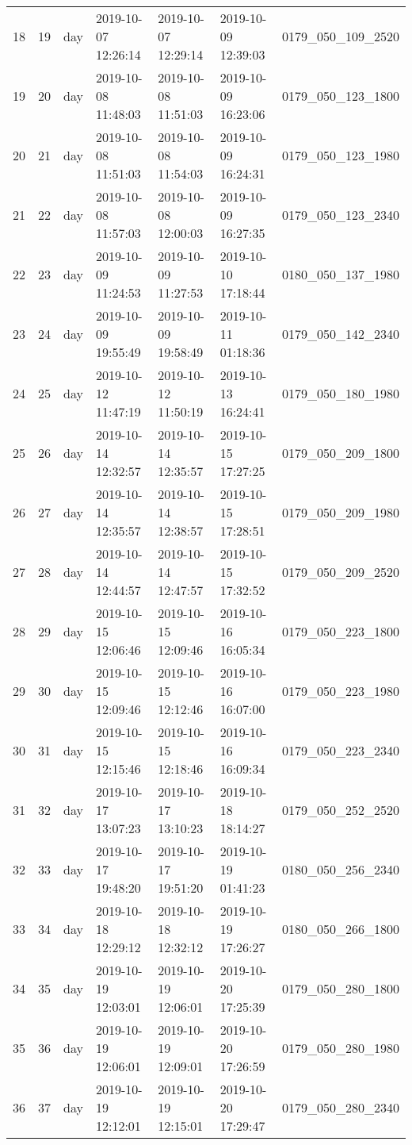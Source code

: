 \begin{longtable}{lrlllll}
18 & 19 & day & 2019-10-07 12:26:14 & 2019-10-07 12:29:14 & 2019-10-09 12:39:03 & 0179_050_109_2520 \\
19 & 20 & day & 2019-10-08 11:48:03 & 2019-10-08 11:51:03 & 2019-10-09 16:23:06 & 0179_050_123_1800 \\
20 & 21 & day & 2019-10-08 11:51:03 & 2019-10-08 11:54:03 & 2019-10-09 16:24:31 & 0179_050_123_1980 \\
21 & 22 & day & 2019-10-08 11:57:03 & 2019-10-08 12:00:03 & 2019-10-09 16:27:35 & 0179_050_123_2340 \\
22 & 23 & day & 2019-10-09 11:24:53 & 2019-10-09 11:27:53 & 2019-10-10 17:18:44 & 0180_050_137_1980 \\
23 & 24 & day & 2019-10-09 19:55:49 & 2019-10-09 19:58:49 & 2019-10-11 01:18:36 & 0179_050_142_2340 \\
24 & 25 & day & 2019-10-12 11:47:19 & 2019-10-12 11:50:19 & 2019-10-13 16:24:41 & 0179_050_180_1980 \\
25 & 26 & day & 2019-10-14 12:32:57 & 2019-10-14 12:35:57 & 2019-10-15 17:27:25 & 0179_050_209_1800 \\
26 & 27 & day & 2019-10-14 12:35:57 & 2019-10-14 12:38:57 & 2019-10-15 17:28:51 & 0179_050_209_1980 \\
27 & 28 & day & 2019-10-14 12:44:57 & 2019-10-14 12:47:57 & 2019-10-15 17:32:52 & 0179_050_209_2520 \\
28 & 29 & day & 2019-10-15 12:06:46 & 2019-10-15 12:09:46 & 2019-10-16 16:05:34 & 0179_050_223_1800 \\
29 & 30 & day & 2019-10-15 12:09:46 & 2019-10-15 12:12:46 & 2019-10-16 16:07:00 & 0179_050_223_1980 \\
30 & 31 & day & 2019-10-15 12:15:46 & 2019-10-15 12:18:46 & 2019-10-16 16:09:34 & 0179_050_223_2340 \\
31 & 32 & day & 2019-10-17 13:07:23 & 2019-10-17 13:10:23 & 2019-10-18 18:14:27 & 0179_050_252_2520 \\
32 & 33 & day & 2019-10-17 19:48:20 & 2019-10-17 19:51:20 & 2019-10-19 01:41:23 & 0180_050_256_2340 \\
33 & 34 & day & 2019-10-18 12:29:12 & 2019-10-18 12:32:12 & 2019-10-19 17:26:27 & 0180_050_266_1800 \\
34 & 35 & day & 2019-10-19 12:03:01 & 2019-10-19 12:06:01 & 2019-10-20 17:25:39 & 0179_050_280_1800 \\
35 & 36 & day & 2019-10-19 12:06:01 & 2019-10-19 12:09:01 & 2019-10-20 17:26:59 & 0179_050_280_1980 \\
36 & 37 & day & 2019-10-19 12:12:01 & 2019-10-19 12:15:01 & 2019-10-20 17:29:47 & 0179_050_280_2340 \\

\end{longtable}
